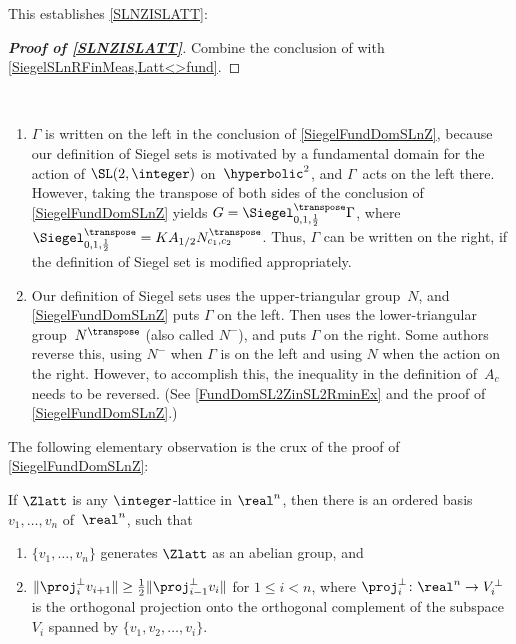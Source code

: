 This establishes \cref{SLNZISLATT}:

\begin{proof}[\bf Proof of \cref{SLNZISLATT}]
Combine the conclusion of  with \cref{SiegelSLnRFinMeas,Latt<>fund}.
\end{proof}

\begin{rems} \label{SiegelRemsLR} \ 
\noprelistbreak
	\begin{enumerate}
	\item \label{SiegelRemsLR-transpose}
	$\Gamma$ is written on the left in the conclusion of \cref{SiegelFundDomSLnZ}, because our definition of Siegel sets is motivated by a fundamental domain for the action of $\SL(2,\integer)$ on~$\hyperbolic^2$, and $\Gamma$~acts on the left there. However, taking the transpose of both sides of the conclusion of \cref{SiegelFundDomSLnZ} yields
		$ G = \Siegel_{0,1,\frac{1}{2}}^\transpose \Gamma$,
	where $\Siegel_{0,1,\frac{1}{2}}^\transpose = K A_{1/2} N_{c_1,c_2}^\transpose$. 
	Thus, $\Gamma$ can be written on the right, if the definition of Siegel set is modified appropriately.
	
	\item Our definition of Siegel sets uses the upper-triangular group~$N$, and \cref{SiegelFundDomSLnZ} puts $\Gamma$ on the left. Then  uses the lower-triangular group~$N^\transpose$ (also called $N^-$), and puts $\Gamma$ on the right. Some authors reverse this, using $N^-$ when $\Gamma$ is on the left and using $N$ when the action on the right. However, to accomplish this, the inequality in the definition of~$A_c$ needs to be reversed. (See \cref{FundDomSL2ZinSL2RminEx} and the proof of \cref{SiegelFundDomSLnZ}.) 
	\end{enumerate}
\end{rems}

The following elementary observation is the crux of the proof of \cref{SiegelFundDomSLnZ}:

\begin{lem} \label{RedSLnZProjLem}
If $\Zlatt$ is any $\integer$-lattice in\/ $\real^n$, then there is an ordered basis $v_1,\ldots,v_n$ of\/~$\real^n$, such that
	\begin{enumerate}
	\item \label{RedSLnZProjLem-gen}
	$\{v_1,\ldots,v_n\}$ generates $\Zlatt$ as an abelian group,
	and
	\item \label{RedSLnZProjLem->1/2}
	$\| \proj_i^\perp v_{i+1} \| \ge \frac{1}{2} \| \proj_{i-1}^\perp v_{i} \|$ for\/ $1 \le i < n$, where\/ $\proj_i^\perp \colon \real^n \to V_i^\perp$ is the orthogonal projection onto the orthogonal complement of the subspace~$V_i$ spanned by\/ $\{v_1,v_2,\ldots,v_i\}$.
	\end{enumerate}
\end{lem}

